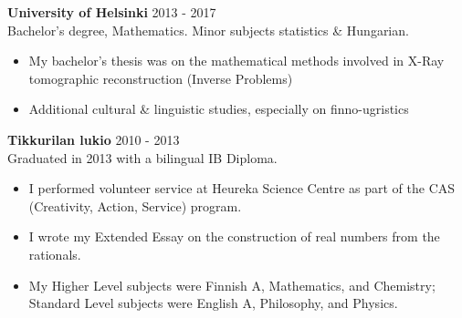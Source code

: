 \documentclass[margin, 10pt]{res} %
\begin{document}
\begin{resume}
\textbf{University of Helsinki} \hfill 2013 - 2017\\
Bachelor's degree, Mathematics. Minor subjects statistics \& Hungarian.
\begin{itemize} \itemsep -2pt
\item My bachelor's thesis was on the mathematical methods involved in X-Ray tomographic reconstruction (Inverse Problems)
\item Additional cultural \& linguistic studies, especially on finno-ugristics
\end{itemize}

\addvspace{-7pt}
\textbf{Tikkurilan lukio} \hfill 2010 - 2013\\
Graduated in 2013 with a bilingual IB Diploma.
\begin{itemize} \itemsep -2pt
\item I performed volunteer service at Heureka Science Centre as part of the CAS (Creativity, Action, Service) program.
\item I wrote my Extended Essay on the construction of real numbers from the rationals.
\item My Higher Level subjects were Finnish A, Mathematics, and Chemistry; Standard Level subjects were English A, Philosophy, and Physics. 
\end{itemize}




\end{resume}
\end{document}
